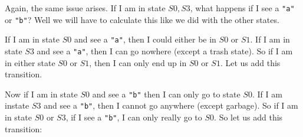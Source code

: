 \documentclass[main.tex]{subfiles}
\begin{document}
Again, the same issue arises. If I am in state $S0,S3$, what happens if I see a \texttt{"a"} or \texttt{"b"}?
Well we will have to calculate this like we did with the other states. 

If I am in state $S0$ and see a \texttt{"a"}, then I could either be in $S0$ or $S1$. If I am in state $S3$ and see a \texttt{"a"}, then I can go nowhere (except a trash state). So if I am in either state $S0$ or $S1$, then I can only end up in $S0$ or $S1$. Let us add this transition. 
\begin{center}
\end{center}

Now if I am in state $S0$ and see a \texttt{"b"} then I can only go to state $S0$. If I am instate $S3$ and see a \texttt{"b"}, then I cannot go anywhere (except garbage). So if I am in state $S0$ or $S3$, if I see a \texttt{"b"}, I can only really go to $S0$. So let us add this transition:
\end{document}
